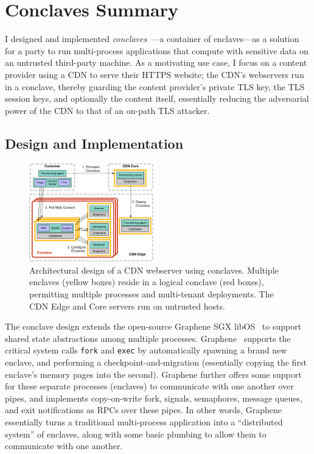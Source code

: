 \section{Conclaves Summary}
\label{sec:conclaves-summary}

I designed and implemented \emph{conclaves}~\cite{phoenix-conclaves}---a
container of enclaves---as a solution for a party to run multi-process
applications that compute with sensitive data on an untrusted third-party
machine.
%
As a motivating use case, I focus on a content provider using a CDN to serve
their HTTPS website; the CDN's webservers run in a conclave, thereby guarding
the content provider's private TLS key, the TLS session keys, and optionally
the content itself, essentially reducing the adversarial power of the CDN to
that of an on-path TLS attacker.

\subsection{Design and Implementation}


\begin{figure}
\centering
\includegraphics[width=0.48\textwidth]{figs/phoenix-design}
	\caption{Architectural design of a CDN webserver using conclaves. Multiple enclaves (yellow
	boxes) reside in a logical conclave (red boxes), permitting
	multiple processes and multi-tenant deployments. The CDN Edge and
	Core servers run on untrusted hosts.}
\label{fig:design}
\end{figure}


The conclave design extends the open-source Graphene SGX libOS~\cite{graphene}
to support shared state abstractions among multiple processes.
%
Graphene~\cite{graphene} supports the critical system calls
\texttt{fork} and \texttt{exec} by automatically spawning a brand new
enclave, and performing a checkpoint-and-migration (essentially copying
the first enclave's memory pages into the second).
%
Graphene further offers some support for these separate processes
(enclaves) to communicate with one another over pipes, and implements
copy-on-write fork, signals, semaphores, message queues, and exit
notifications as RPCs over these pipes.
%
In other words, Graphene essentially turns a traditional multi-process
application into a ``distributed system'' of enclaves, along with some
basic plumbing to allow them to communicate with one another.


